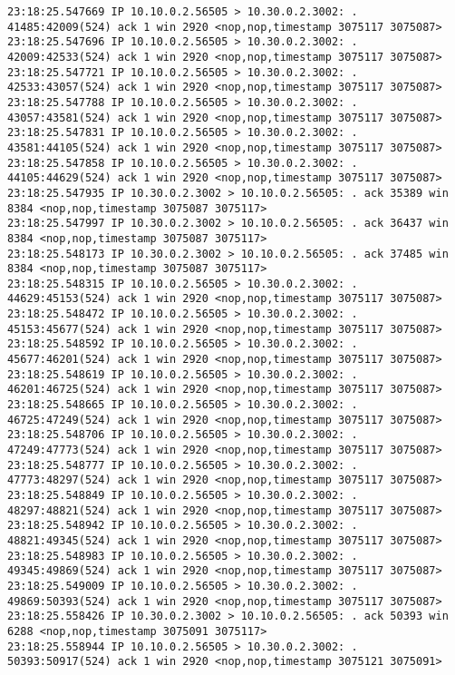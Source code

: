 \documentclass[a4paper,12pt]{article}
\begin{document}
\begin{Verbatim}
23:18:25.547669 IP 10.10.0.2.56505 > 10.30.0.2.3002: . 41485:42009(524) ack 1 win 2920 <nop,nop,timestamp 3075117 3075087>
23:18:25.547696 IP 10.10.0.2.56505 > 10.30.0.2.3002: . 42009:42533(524) ack 1 win 2920 <nop,nop,timestamp 3075117 3075087>
23:18:25.547721 IP 10.10.0.2.56505 > 10.30.0.2.3002: . 42533:43057(524) ack 1 win 2920 <nop,nop,timestamp 3075117 3075087>
23:18:25.547788 IP 10.10.0.2.56505 > 10.30.0.2.3002: . 43057:43581(524) ack 1 win 2920 <nop,nop,timestamp 3075117 3075087>
23:18:25.547831 IP 10.10.0.2.56505 > 10.30.0.2.3002: . 43581:44105(524) ack 1 win 2920 <nop,nop,timestamp 3075117 3075087>
23:18:25.547858 IP 10.10.0.2.56505 > 10.30.0.2.3002: . 44105:44629(524) ack 1 win 2920 <nop,nop,timestamp 3075117 3075087>
23:18:25.547935 IP 10.30.0.2.3002 > 10.10.0.2.56505: . ack 35389 win 8384 <nop,nop,timestamp 3075087 3075117>
23:18:25.547997 IP 10.30.0.2.3002 > 10.10.0.2.56505: . ack 36437 win 8384 <nop,nop,timestamp 3075087 3075117>
23:18:25.548173 IP 10.30.0.2.3002 > 10.10.0.2.56505: . ack 37485 win 8384 <nop,nop,timestamp 3075087 3075117>
23:18:25.548315 IP 10.10.0.2.56505 > 10.30.0.2.3002: . 44629:45153(524) ack 1 win 2920 <nop,nop,timestamp 3075117 3075087>
23:18:25.548472 IP 10.10.0.2.56505 > 10.30.0.2.3002: . 45153:45677(524) ack 1 win 2920 <nop,nop,timestamp 3075117 3075087>
23:18:25.548592 IP 10.10.0.2.56505 > 10.30.0.2.3002: . 45677:46201(524) ack 1 win 2920 <nop,nop,timestamp 3075117 3075087>
23:18:25.548619 IP 10.10.0.2.56505 > 10.30.0.2.3002: . 46201:46725(524) ack 1 win 2920 <nop,nop,timestamp 3075117 3075087>
23:18:25.548665 IP 10.10.0.2.56505 > 10.30.0.2.3002: . 46725:47249(524) ack 1 win 2920 <nop,nop,timestamp 3075117 3075087>
23:18:25.548706 IP 10.10.0.2.56505 > 10.30.0.2.3002: . 47249:47773(524) ack 1 win 2920 <nop,nop,timestamp 3075117 3075087>
23:18:25.548777 IP 10.10.0.2.56505 > 10.30.0.2.3002: . 47773:48297(524) ack 1 win 2920 <nop,nop,timestamp 3075117 3075087>
23:18:25.548849 IP 10.10.0.2.56505 > 10.30.0.2.3002: . 48297:48821(524) ack 1 win 2920 <nop,nop,timestamp 3075117 3075087>
23:18:25.548942 IP 10.10.0.2.56505 > 10.30.0.2.3002: . 48821:49345(524) ack 1 win 2920 <nop,nop,timestamp 3075117 3075087>
23:18:25.548983 IP 10.10.0.2.56505 > 10.30.0.2.3002: . 49345:49869(524) ack 1 win 2920 <nop,nop,timestamp 3075117 3075087>
23:18:25.549009 IP 10.10.0.2.56505 > 10.30.0.2.3002: . 49869:50393(524) ack 1 win 2920 <nop,nop,timestamp 3075117 3075087>
23:18:25.558426 IP 10.30.0.2.3002 > 10.10.0.2.56505: . ack 50393 win 6288 <nop,nop,timestamp 3075091 3075117>
23:18:25.558944 IP 10.10.0.2.56505 > 10.30.0.2.3002: . 50393:50917(524) ack 1 win 2920 <nop,nop,timestamp 3075121 3075091>

\end{Verbatim}
\end{document}
